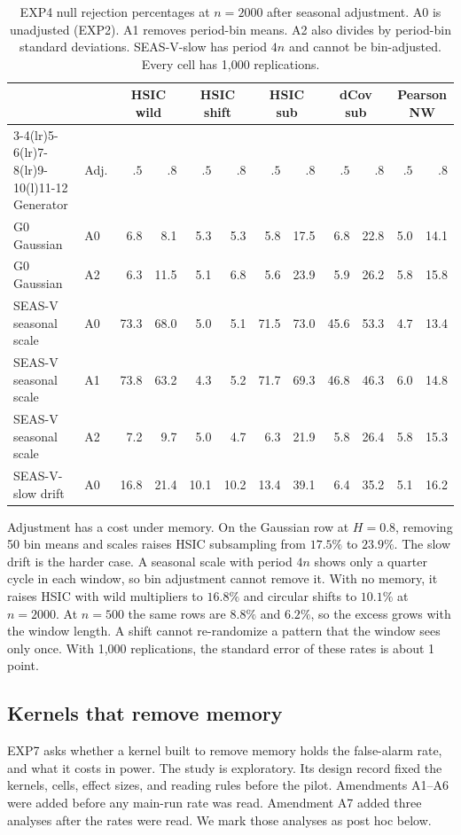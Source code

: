 \documentclass[11pt]{article}
\theoremstyle{remark}
\begin{document}
\begin{table}[H]
\centering\footnotesize
\setlength{\tabcolsep}{4pt}
\caption{EXP4 null rejection percentages at $n=2000$ after seasonal adjustment. A0 is unadjusted (EXP2). A1 removes period-bin means. A2 also divides by period-bin standard deviations. SEAS-V-slow has period $4n$ and cannot be bin-adjusted. Every cell has 1,000 replications.}\label{tab:deseason}
\begin{tabular}{@{}llrrrrrrrrrr@{}}
\toprule
& & \multicolumn{2}{c}{HSIC wild} & \multicolumn{2}{c}{HSIC shift} & \multicolumn{2}{c}{HSIC sub} & \multicolumn{2}{c}{dCov sub} & \multicolumn{2}{c}{Pearson NW} \\
\cmidrule(lr){3-4}\cmidrule(lr){5-6}\cmidrule(lr){7-8}\cmidrule(lr){9-10}\cmidrule(l){11-12}
Generator & Adj. & $.5$ & $.8$ & $.5$ & $.8$ & $.5$ & $.8$ & $.5$ & $.8$ & $.5$ & $.8$ \\
\midrule
G0 Gaussian & A0 & 6.8 & 8.1 & 5.3 & 5.3 & 5.8 & 17.5 & 6.8 & 22.8 & 5.0 & 14.1 \\
G0 Gaussian & A2 & 6.3 & 11.5 & 5.1 & 6.8 & 5.6 & 23.9 & 5.9 & 26.2 & 5.8 & 15.8 \\
SEAS-V seasonal scale & A0 & 73.3 & 68.0 & 5.0 & 5.1 & 71.5 & 73.0 & 45.6 & 53.3 & 4.7 & 13.4 \\
SEAS-V seasonal scale & A1 & 73.8 & 63.2 & 4.3 & 5.2 & 71.7 & 69.3 & 46.8 & 46.3 & 6.0 & 14.8 \\
SEAS-V seasonal scale & A2 & 7.2 & 9.7 & 5.0 & 4.7 & 6.3 & 21.9 & 5.8 & 26.4 & 5.8 & 15.3 \\
\midrule
SEAS-V-slow drift & A0 & 16.8 & 21.4 & 10.1 & 10.2 & 13.4 & 39.1 & 6.4 & 35.2 & 5.1 & 16.2 \\
\bottomrule
\end{tabular}
\end{table}

Adjustment has a cost under memory. On the Gaussian row at $H=0.8$, removing 50 bin means and scales raises HSIC subsampling from $17.5\%$ to $23.9\%$. The slow drift is the harder case. A seasonal scale with period $4n$ shows only a quarter cycle in each window, so bin adjustment cannot remove it. With no memory, it raises HSIC with wild multipliers to $16.8\%$ and circular shifts to $10.1\%$ at $n=2000$. At $n=500$ the same rows are $8.8\%$ and $6.2\%$, so the excess grows with the window length. A shift cannot re-randomize a pattern that the window sees only once. With 1,000 replications, the standard error of these rates is about 1 point.

\subsection{Kernels that remove memory}\label{sec:exp7}
EXP7 asks whether a kernel built to remove memory holds the false-alarm rate, and what it costs in power. The study is exploratory. Its design record fixed the kernels, cells, effect sizes, and reading rules before the pilot. Amendments A1--A6 were added before any main-run rate was read. Amendment A7 added three analyses after the rates were read. We mark those analyses as post hoc below.
\end{document}
